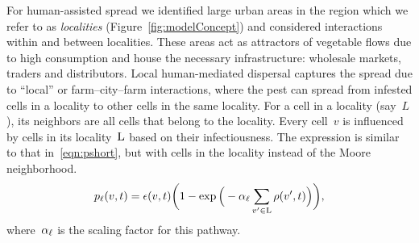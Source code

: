 \documentclass[11pt]{article}
\newcommand{\infest}{\rho}
\newcommand{\suitable}{\epsilon}
\theoremstyle{definition}
\begin{document}
For human-assisted spread we identified large urban areas in the region
which we refer to as {\it localities} (Figure~\ref{fig:modelConcept}) and
considered 
interactions within and between localities. These areas act as attractors
of vegetable flows due to high consumption and house the necessary
infrastructure: wholesale markets, traders and distributors.
Local human-mediated dispersal captures the spread due to ``local'' or
farm--city--farm interactions, where the pest can spread from infested
cells in a locality to other cells in the same locality. 
For a cell in a locality (say~$L$), its neighbors are all cells that belong
to the locality.  
Every cell~$v$ is influenced by cells in
its locality~$\mathrm{L}$ based on their infectiousness.  The expression is
similar to that in~\eqref{eqn:pshort}, but with cells in the locality
instead of the Moore neighborhood.
\begin{align}\label{eqn:plocal}
    \plocal(v,t)=\suitable(v,t)\bigg(1-
    \exp\Big(-\afm\sum_{v'\in\locality}\infest(v',t)\Big)\bigg),
\end{align}
where~$\alpha_{\ell}$ is the scaling factor for this pathway. 
\end{document}
